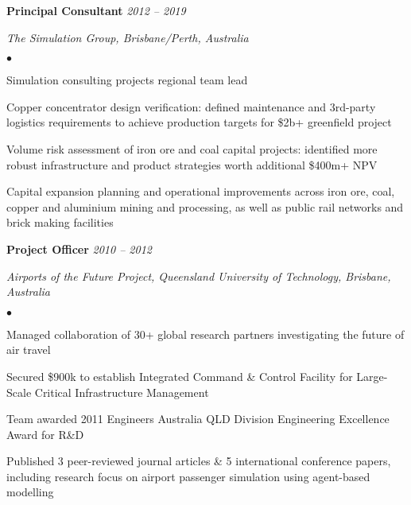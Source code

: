 \documentclass[margin,line]{resume}
\newenvironment{list1}{
  \begin{list}{}{%
      \setlength{\itemsep}{0in}
      \setlength{\parsep}{0in} \setlength{\parskip}{0in}
      \setlength{\topsep}{0in} \setlength{\partopsep}{0in}
      \setlength{\leftmargin}{0.17in}}}{\end{list}}
\newenvironment{list2}{
  \begin{list}{$\bullet$}{%
      \setlength{\itemsep}{0in}
      \setlength{\parsep}{0in} \setlength{\parskip}{0in}
      \setlength{\topsep}{0in} \setlength{\partopsep}{0in}
      \setlength{\leftmargin}{0.2in}}}{\end{list}}
\begin{document}
\begin{resume}
{\textbf{Principal Consultant}} \hfill {\it 2012 -- 2019}\\
\vspace{-0.85\baselineskip}
\begin{list1}
\item {\it The Simulation Group, Brisbane/Perth, Australia}
\begin{list2}
\item Simulation consulting projects regional team lead
\item Copper concentrator design verification: defined maintenance and 3rd-party logistics requirements to achieve production targets for \$2b+ greenfield project
\item Volume risk assessment of iron ore and coal capital projects: identified more robust infrastructure and product strategies worth additional \$400m+ NPV
\item Capital expansion planning and operational improvements across iron ore, coal, copper and aluminium mining and processing, as well as public rail networks and brick making facilities
\end{list2}
\end{list1}

{\textbf{Project Officer}} \hfill {\it 2010 -- 2012}\\
\vspace{-0.85\baselineskip}
\begin{list1}
\item {\it Airports of the Future Project, Queensland University of Technology, Brisbane, Australia}
\begin{list2}
\item Managed collaboration of 30+ global research partners investigating the future of air travel
\item Secured \$900k to establish Integrated Command \& Control Facility for Large-Scale Critical Infrastructure Management
\item Team awarded 2011 Engineers Australia QLD Division Engineering Excellence Award for R\&D
\item Published 3 peer-reviewed journal articles \& 5 international conference papers, including research focus on airport passenger simulation using agent-based modelling
\end{list2}
\end{list1}


\end{resume}
\end{document}
